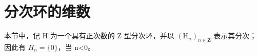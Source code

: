 \section{分次环的维数}

本节中，记 H 为一个具有正次数的 Z 型分次环，并以 \((\mathrm{H}_{n})_{n\in\mathbf{Z}}\) 表示其分次；因此有 \(H_{n}=\{0\}\)，当 n\textless0。

